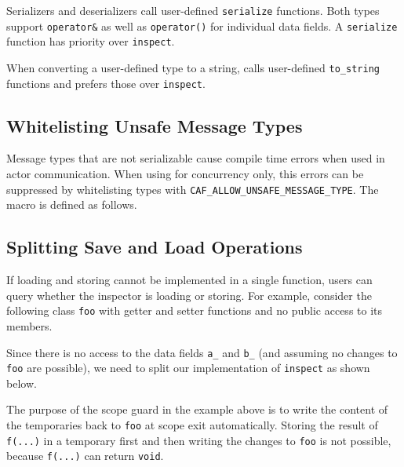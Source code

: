 Serializers and deserializers call user-defined \lstinline^serialize^
functions. Both types support \lstinline^operator&^ as well as
\lstinline^operator()^ for individual data fields. A \lstinline^serialize^
function has priority over \lstinline^inspect^.

When converting a user-defined type to a string, \lib calls user-defined
\lstinline^to_string^ functions and prefers those over \lstinline^inspect^.

\subsection{Whitelisting Unsafe Message Types}
\label{unsafe-message-type}

Message types that are not serializable cause compile time errors when used in
actor communication. When using \lib for concurrency only, this errors can be
suppressed by whitelisting types with
\lstinline^CAF_ALLOW_UNSAFE_MESSAGE_TYPE^. The macro is defined as follows.


\clearpage
\subsection{Splitting Save and Load Operations}

If loading and storing cannot be implemented in a single function, users can
query whether the inspector is loading or storing. For example, consider the
following class \lstinline^foo^ with getter and setter functions and no public
access to its members.


\clearpage
Since there is no access to the data fields \lstinline^a_^ and \lstinline^b_^
(and assuming no changes to \lstinline^foo^ are possible), we need to split our
implementation of \lstinline^inspect^ as shown below.


The purpose of the scope guard in the example above is to write the content of
the temporaries back to \lstinline^foo^ at scope exit automatically. Storing
the result of \lstinline^f(...)^ in a temporary first and then writing the
changes to \lstinline^foo^ is not possible, because \lstinline^f(...)^ can
return \lstinline^void^.
